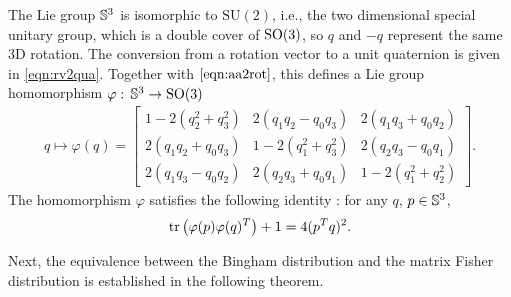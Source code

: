 The Lie group $\mathbb{S}^3$ is isomorphic to $\mathrm{SU}(2)$, i.e., the two dimensional special unitary group, which is a double cover of $\mathrm{SO}(3)$, so $q$ and $-q$ represent the same 3D rotation.
The conversion from a rotation vector to a unit quaternion is given in \eqref{eqn:rv2qua}.
Together with $\eqref{eqn:aa2rot}$, this defines a Lie group homomorphism $\varphi:\, \mathbb{S}^3\to\mathrm{SO}(3)$
\begin{align} \label{eqn:SO3-Sph3}
	q \mapsto \varphi(q) =  \begin{bmatrix}
		1-2(q_2^2+q_3^2) & 2(q_1q_2-q_0q_3) & 2(q_1q_3+q_0q_2) \\
		2(q_1q_2+q_0q_3) & 1-2(q_1^2+q_3^2) & 2(q_2q_3-q_0q_1) \\
		2(q_1q_3-q_0q_2) & 2(q_2q_3+q_0q_1) & 1-2(q_1^2+q_2^2)
	\end{bmatrix}.
\end{align}
The homomorphism $\varphi$ satisfies the following identity \cite{prentice1986orientation}:
for any $q$, $p\in\mathbb{S}^3$,
\begin{align} \label{eqn:q_1^Tq_2}
	\mathrm{tr}\left( \varphi(p)\varphi(q)^T \right) + 1 = 4(p^Tq)^2.
\end{align}

Next, the equivalence between the Bingham distribution and the matrix Fisher distribution is established in the following theorem.

